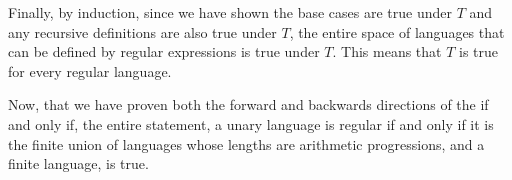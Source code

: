 \documentclass[11pt]{article}
\begin{document}
\begin{enumerate}
    Finally, by induction, since we have shown the base cases are true under $T$ and any recursive definitions are also true under $T$, the entire space of languages that can be defined by regular expressions is true under $T$. This means that $T$ is true for every regular language.

    Now, that we have proven both the forward and backwards directions of the if and only if, the entire statement, a unary language is regular if and only if it is the finite union of languages whose lengths are arithmetic progressions, and a finite language, is true.
    
\end{enumerate}
\end{document}
